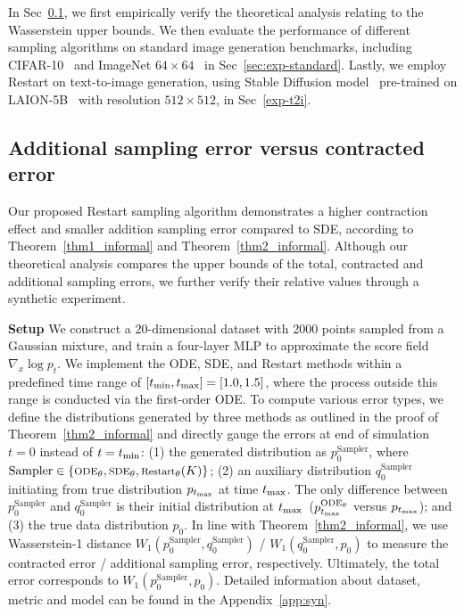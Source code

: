 In Sec~\ref{sec:exp-verify}, we first empirically verify the theoretical analysis relating to the Wasserstein upper bounds. We then evaluate the performance of different sampling algorithms on standard image generation benchmarks, including CIFAR-10~\cite{Krizhevsky2009LearningML} and ImageNet $64\times 64$~\cite{Deng2009ImageNetAL} in Sec~\ref{sec:exp-standard}. Lastly, we employ Restart on text-to-image generation, using Stable Diffusion model~\cite{Rombach2021HighResolutionIS} pre-trained on LAION-5B~\cite{Schuhmann2022LAION5BAO} with resolution $512\times 512$, in Sec~\ref{exp-t2i}.

\subsection{Additional sampling error versus contracted error}
\label{sec:exp-verify}
Our proposed Restart sampling algorithm demonstrates a higher contraction effect and smaller addition sampling error compared to SDE, according to Theorem~\ref{thm1_informal} and Theorem~\ref{thm2_informal}. Although our theoretical analysis compares the upper bounds of the total, contracted and additional sampling errors, we further verify their relative values through a synthetic experiment.

\textbf{Setup } We construct a $20$-dimensional dataset with 2000 points sampled from a Gaussian mixture, and train a four-layer MLP to approximate the score field $\nabla_x \log p_t$. We implement the ODE, SDE, and Restart methods within a predefined time range of $[t_{\textrm{min}}, t_{\textrm{max}}]=[1.0, 1.5]$, where the process outside this range is conducted via the first-order ODE. To compute various error types, we define the distributions generated by three methods as outlined in the proof of Theorem~\ref{thm2_informal} and directly gauge the errors at end of simulation $t=0$ instead of $t=t_{\textrm{min}}$: (1) the generated distribution as {\footnotesize $p^{\textrm{Sampler}}_{0}$}, where $\textrm{Sampler} \in {\footnotesize \{{\textrm{ODE}_\theta}, {\textrm{SDE}_\theta}, {\textrm{Restart}_\theta}(K)\}}$; (2) an auxiliary distribution {\footnotesize $q^{\textrm{Sampler}}_{0}$} initiating from true distribution $p_{t_{\textrm{max}}}$ at time $t_{\textrm{max}}$. The only difference between {\footnotesize $p^{\textrm{Sampler}}_{0}$} and {\footnotesize $q^{\textrm{Sampler}}_{0}$} is their initial distribution at $t_{\textrm{max}}$~({\footnotesize $p^{{\textrm{ODE}_\theta}}_{t_{\textrm{max}}}$} versus $p_{t_{\textrm{max}}}$); and (3) the true data distribution $p_{0}$. In line with Theorem~\ref{thm2_informal}, we use Wasserstein-1 distance {\footnotesize $W_1(p^{\textrm{Sampler}}_{0},q^{\textrm{Sampler}}_{0})$ / $W_1(q^{\textrm{Sampler}}_{0}, p_{0})$} to measure the contracted error / additional sampling error, respectively. Ultimately, the total error corresponds to {\footnotesize $W_1(p^{\textrm{Sampler}}_{0}, p_{0})$}. Detailed information about dataset, metric and model can be found in the Appendix~\ref{app:syn}.



